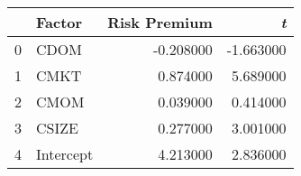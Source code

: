 \begin{tabular}{llrr}
\toprule
 & Factor & Risk Premium & \emph{t} \\
\midrule
0 & CDOM & -0.208000 & -1.663000 \\
1 & CMKT & 0.874000 & 5.689000 \\
2 & CMOM & 0.039000 & 0.414000 \\
3 & CSIZE & 0.277000 & 3.001000 \\
4 & Intercept & 4.213000 & 2.836000 \\
\bottomrule
\end{tabular}
